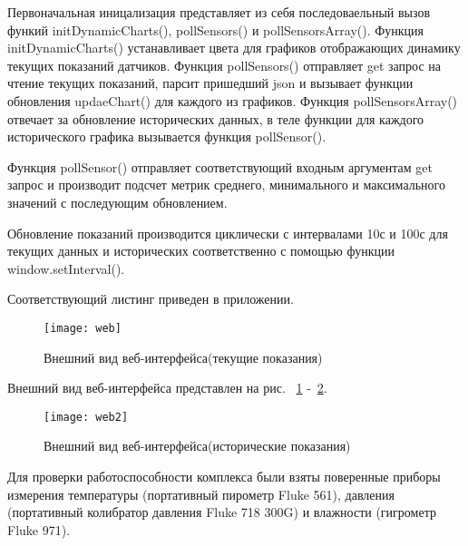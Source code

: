 Первоначальная иницализация представляет из себя последоваельный вызов функий initDynamicCharts(), pollSensors() и pollSensorsArray(). Функция initDynamicCharts() устанавливает цвета для графиков отображающих динамику текущих показаний датчиков.  Функция pollSensors() отправляет get запрос на чтение текущих показаний, парсит пришедший json и вызывает функции обновления updaeChart() для каждого из графиков. 
Функция pollSensorsArray() отвечает за обновление исторических данных, в теле функции для каждого исторического графика вызывается функция pollSensor(). 

Функция pollSensor() отправляет соответствующий входным аргументам get запрос и производит подсчет метрик среднего, минимального и максимального значений с последующим обновлением.

Обновление показаний производится циклически с интервалами 10с и 100с для текущих данных и исторических соответственно с помощью функции window.setInterval(). 

Соответствующий листинг приведен в приложении.
\begin{figure}[h]
	\centering
	\texttt{[image: web]}
	\caption{Внешний вид веб-интерфейса(текущие показания)}
	\label{fig:web}
\end{figure}

Внешний вид веб-интерфейса представлен на рис. ~\ref{fig:web} -~\ref{fig:web2}.

\begin{figure}[h]
	\centering
	\texttt{[image: web2]} 
	\caption{Внешний вид веб-интерфейса(исторические показания)}
	\label{fig:web2}
\end{figure}

Для проверки работоспособности комплекса были взяты поверенные приборы измерения температуры (портативный пирометр Fluke 561), давления (портативный колибратор давления Fluke 718 300G) и влажности (гигрометр Fluke 971).



%
%





